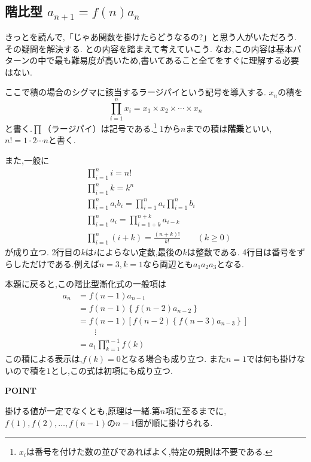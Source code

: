 
\subsection{\texorpdfstring{階比型  $a_{n+1}=f(n)a_n$}{階比型}}\label{節：階比型}
  きっとを読んで,「じゃあ関数を掛けたらどうなるの?」と思う人がいただろう.
  その疑問を解決する.
  との内容を踏まえて考えていこう.
  なお,この内容は基本パターンの中で最も難易度が高いため,書いてあること全てをすぐに理解する必要はない.

  
    ここで積の場合のシグマに該当するラージパイという記号を導入する.
    $x_n$の積を
    \[
      \prod_{i=1}^n x_i
      =x_1\times x_2\times\cdots\times x_n
    \]
    と書く.$\prod$（ラージパイ）は記号である.\footnote{$x_i$は番号を付けた数の並びであればよく,特定の規則は不要である.}
    $1$から$n$までの積は\textbf{階乗}といい,$n!=1\cdot2\cdots n$と書く.
    
    また,一般に
    \begin{align*}
      &\prod_{i=1}^{n}i=n!\\
      &\prod_{i=1}^{n}k=k^n\\
      &\prod_{i=1}^{n}a_ib_i=\displaystyle\prod_{i=1}^na_i\displaystyle\prod_{i=1}^nb_i\\
      &\prod_{i=1}^{n}a_i=\displaystyle\prod_{i=1+k}^{n+k}a_{i-k}\\
      &\prod_{i=1}^{n}(i+k)=\frac{(n+k)!}{k!}\qquad(k\ge0)
    \end{align*}
    が成り立つ.
    2行目の$k$は$i$によらない定数,最後の$k$は整数である.
    4行目は番号をずらしただけである.例えば$n=3,k=1$なら両辺とも$a_1a_2a_3$となる.
    
    本題に戻ると,この階比型漸化式の一般項は
    \begin{align*}
      a_n&=f(n-1)a_{n-1}\\
      &=f(n-1)\left\{f(n-2)a_{n-2}\right\}\\
      &=f(n-1) \left[ f(n-2)\left\{f(n-3)a_{n-3}\right\} \right] \\
      &\qquad \vdots\\
      &=a_1\prod_{k=1}^{n-1} f(k)
    \end{align*}
    この積による表示は,$f(k)=0$となる場合も成り立つ.
    また$n=1$では何も掛けないので積を$1$とし,この式は初項にも成り立つ.
    \begin{bookpoint}
      \textbf{POINT}\par
      掛ける値が一定でなくとも,原理は一緒.第$n$項に至るまでに,$f(1),f(2),\ldots,f(n-1)$の$n-1$個が順に掛けられる.
    \end{bookpoint}
    
